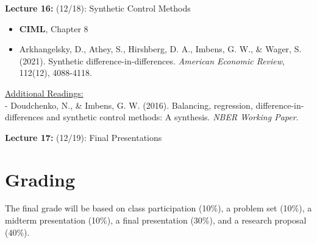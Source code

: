 \documentclass[12pt]{article}
\begin{document}
\vspace{2em}
\noindent\textbf{Lecture 16:} (12/18): Synthetic Control Methods  \\
\vspace{1em}
\begin{itemize}
    \item \textbf{CIML}, Chapter 8
    \item Arkhangelsky, D., Athey, S., Hirshberg, D. A., Imbens, G. W., \& Wager, S. (2021). Synthetic difference-in-differences. \textit{American Economic Review}, 112(12), 4088-4118.
\end{itemize}
\vspace{1em}
\underline{Additional Readings:} \\
\hspace{1em} - Doudchenko, N., \& Imbens, G. W. (2016). Balancing, regression, difference-in-differences and synthetic control methods: A synthesis. \textit{NBER Working Paper}.

\vspace{2em}
\noindent\textbf{Lecture 17:} (12/19): Final Presentations \\

\section*{Grading}
The final grade will be based on class participation (10\%), a problem set (10\%), a midterm presentation (10\%), a final presentation (30\%), and a research proposal (40\%). 
\end{document}
